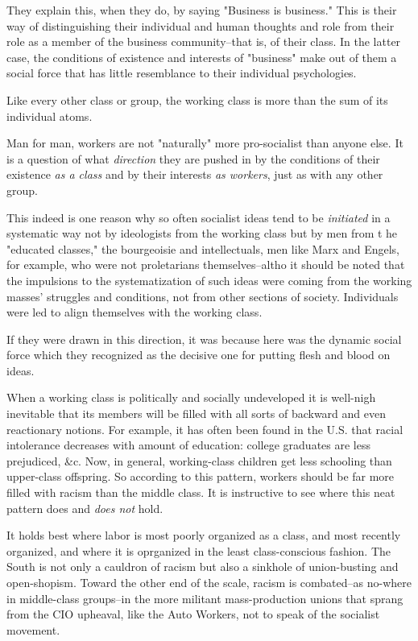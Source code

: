 They explain this, when they do, by saying "Business is business." This is their way of distinguishing their individual and human thoughts and role from their role as a member of the business community--that is, of their class. In the latter case, the conditions of existence and interests of "business" make out of them a social force that has little resemblance to their individual psychologies.

Like every other class or group, the working class is more than the sum of its individual atoms.

Man for man, workers are not "naturally" more pro-socialist than anyone else. It is a question of what \emph{direction} they are pushed in by the conditions of their existence \emph{as a class} and by their interests \emph{as workers}, just as with any other group.

This indeed is one reason why so often socialist ideas tend to be \emph{initiated} in a systematic way not by ideologists from the working class but by men from t he "educated classes," the bourgeoisie and intellectuals, men like Marx and Engels, for example, who were not proletarians themselves--altho it should be noted that the impulsions to the systematization of such ideas were coming from the working masses' struggles and conditions, not from other sections of society. Individuals were led to align themselves with the working class.

If they were drawn in this direction, it was because here was the dynamic social force which they recognized as the decisive one for putting flesh and blood on ideas.

When a working class is politically and socially undeveloped it is well-nigh inevitable that its members will be filled with all sorts of backward and even reactionary notions. For example, it has often been found in the U.S. that racial intolerance decreases with amount of education: college graduates are less prejudiced, \&c. Now, in general, working-class children get less schooling than upper-class offspring. So according to this pattern, workers should be far more filled with racism than the middle class. It is instructive to see where this neat pattern does and \emph{does not} hold.

It holds best where labor is most poorly organized as a class, and most recently organized, and where it is oprganized in the least class-conscious fashion. The South is not only a cauldron of racism but also a sinkhole of union-busting and open-shopism. Toward the other end of the scale, racism is combated--as no-where in middle-class groups--in the more militant mass-production unions that sprang from the CIO upheaval, like the Auto Workers, not to speak of the socialist movement.

